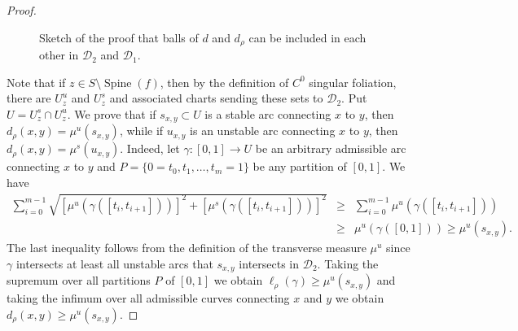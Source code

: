 \documentclass[10pt,a4paper]{amsart}
\newcommand{\mc}{\mathcal}
\newcommand{\spine}{\operatorname{Spine}}
\begin{document}
\begin{proof}
\begin{figure}[ht]
{
}

    \caption{Sketch of the proof that balls of $d$ and $d_\rho$ can be included in each other in $\mc{D}_2$ and $\mc{D}_1$.}
    \label{fig:sketch}
\end{figure}

Note that if 
$z\in S\setminus \spine(f)$, then by the definition of $C^0$ singular foliation, there are $U^u_z$ and $U^s_z$
and associated charts sending these sets to $\mc{D}_2$.
Put $U=U_z^s\cap U_z^u$.
We prove that if
$s_{x,y}\subset U$ is a stable arc connecting $x$ to $y$, then $d_\rho(x,y)=\mu^u(s_{x,y})$, while if $u_{x,y}$ is an unstable arc connecting $x$ to $y$, then $d_\rho(x,y)=\mu^s(u_{x,y})$. 
Indeed, let $\gamma\colon[0,1]\to U$ be an arbitrary admissible arc connecting $x$ to $y$ and $P=\{0=t_0,t_1,\dots,t_m=1\}$ be any partition of $[0,1]$. We have
\begin{eqnarray*}
\sum_{i=0}^{m-1} \sqrt{\left[ \mu^u(\gamma([t_i, t_{i+1}])) \right]^2 + \left[ \mu^s(\gamma([t_i, t_{i+1}])) \right]^2} &\geq& \sum_{i=0}^{m-1} \mu^u(\gamma([t_i, t_{i+1}]))\\
&\geq& \mu^u(\gamma([0,1])) \geq \mu^u(s_{x,y}).
\end{eqnarray*}
The last inequality follows from the definition of the transverse measure $\mu^u$ since $\gamma$ intersects at least all unstable arcs that $s_{x,y}$ intersects in $\mc{D}_2$. Taking the supremum over all partitions $P$ of $[0,1]$ we obtain $\ell_{\rho}(\gamma)\geq \mu^u(s_{x,y})$ and taking the infimum over all admissible curves connecting $x$ and $y$ we obtain $d_{\rho}(x,y)\geq \mu^u(s_{x,y})$.


\end{proof}
\end{document}
